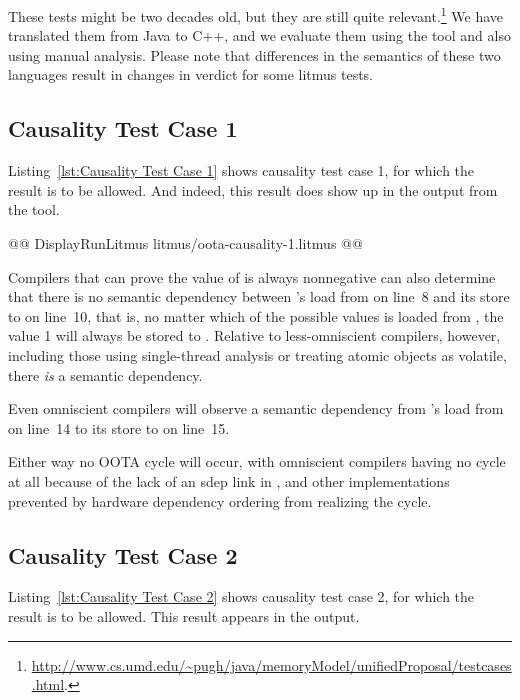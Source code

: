 \documentclass[10]{article}
\begin{document}
These tests might be two decades old, but they are still quite
relevant.\footnote{
	\url{http://www.cs.umd.edu/~pugh/java/memoryModel/unifiedProposal/testcases.html}.}
We have translated them from Java to C++, and we evaluate them using
the  tool and also using manual analysis.
Please note that differences in the semantics of these two languages
result in changes in verdict for some litmus tests.

\subsection{Causality Test Case 1}
\label{app:Causality Test Case 1}

Listing~\ref{lst:Causality Test Case 1}
shows causality test case 1, for which the  result
is to be allowed.
And indeed, this result does show up in the output from the  tool.

\begin{listing}[tbp]
@@ DisplayRunLitmus litmus/oota-causality-1.litmus @@
\caption{Causality Test Case 1}
\label{lst:Causality Test Case 1}
\end{listing}

Compilers that can prove the value of  is always
nonnegative can also determine that there is no semantic dependency between
's load from  on line~8 and its store to  on line~10,
that is, no matter which of the possible values is loaded from ,
the value 1 will always be stored to .
Relative to less-omniscient compilers, however,
including those using single-thread analysis or treating atomic
objects as volatile, there \emph{is} a semantic dependency.

Even omniscient compilers will observe a semantic dependency from
's load from  on line~14 to its store to  on line~15.

Either way no OOTA cycle will occur, with omniscient compilers
having no cycle at all because of the lack of an sdep link in ,
and other implementations prevented by hardware
dependency ordering from realizing the cycle.

\subsection{Causality Test Case 2}
\label{app:Causality Test Case 2}

Listing~\ref{lst:Causality Test Case 2}
shows causality test case 2, for which the  result
is to be allowed.
This result appears in the  output.
\end{document}
